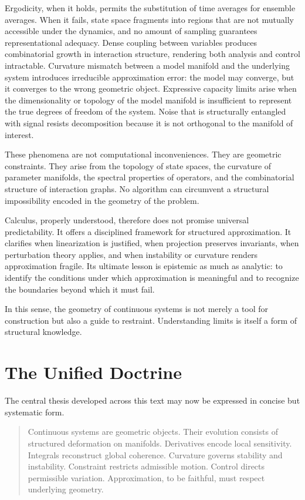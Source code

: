 \documentclass[12pt]{book}
\begin{document}
Ergodicity, when it holds, permits the substitution of time averages
for ensemble averages. When it fails, state space fragments into
regions that are not mutually accessible under the dynamics, and no
amount of sampling guarantees representational adequacy. Dense
coupling between variables produces combinatorial growth in
interaction structure, rendering both analysis and control
intractable. Curvature mismatch between a model manifold and the
underlying system introduces irreducible approximation error: the
model may converge, but it converges to the wrong geometric object.
Expressive capacity limits arise when the dimensionality or topology
of the model manifold is insufficient to represent the true degrees of
freedom of the system. Noise that is structurally entangled with
signal resists decomposition because it is not orthogonal to the
manifold of interest.

These phenomena are not computational inconveniences. They are
geometric constraints. They arise from the topology of state spaces,
the curvature of parameter manifolds, the spectral properties of
operators, and the combinatorial structure of interaction graphs.
No algorithm can circumvent a structural impossibility encoded in the
geometry of the problem.

Calculus, properly understood, therefore does not promise universal
predictability. It offers a disciplined framework for structured
approximation. It clarifies when linearization is justified, when
projection preserves invariants, when perturbation theory applies, and
when instability or curvature renders approximation fragile. Its
ultimate lesson is epistemic as much as analytic: to identify the
conditions under which approximation is meaningful and to recognize
the boundaries beyond which it must fail.

In this sense, the geometry of continuous systems is not merely a tool
for construction but also a guide to restraint. Understanding limits
is itself a form of structural knowledge.

\section{The Unified Doctrine}

The central thesis developed across this text may now be expressed in
concise but systematic form.

\begin{quote}
Continuous systems are geometric objects. Their evolution consists of
structured deformation on manifolds. Derivatives encode local
sensitivity. Integrals reconstruct global coherence. Curvature governs
stability and instability. Constraint restricts admissible motion.
Control directs permissible variation. Approximation, to be faithful,
must respect underlying geometry.
\end{quote}
\end{document}
